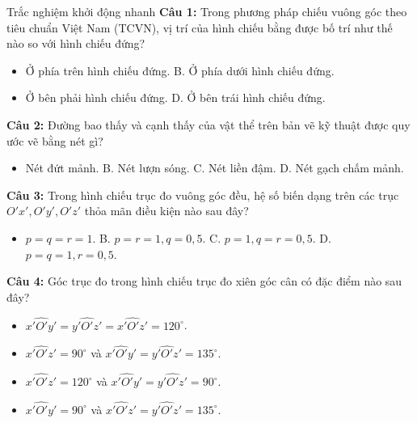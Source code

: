 \documentclass[12pt, a4paper]{article}
\begin{document}
\begin{pedabox}{Trắc nghiệm khởi động nhanh}
\textbf{Câu 1:} Trong phương pháp chiếu vuông góc theo tiêu chuẩn Việt Nam (TCVN), vị trí của hình chiếu bằng được bố trí như thế nào so với hình chiếu đứng?
\begin{itemize}[leftmargin=0.5cm]
    \item[A.] Ở phía trên hình chiếu đứng. \quad B. Ở phía dưới hình chiếu đứng.
    \item[C.] Ở bên phải hình chiếu đứng. \quad D. Ở bên trái hình chiếu đứng.
\end{itemize}

\textbf{Câu 2:} Đường bao thấy và cạnh thấy của vật thể trên bản vẽ kỹ thuật được quy ước vẽ bằng nét gì?
\begin{itemize}[leftmargin=0.5cm]
    \item[A.] Nét đứt mảnh. \quad B. Nét lượn sóng. \quad C. Nét liền đậm. \quad D. Nét gạch chấm mảnh.
\end{itemize}

\textbf{Câu 3:} Trong hình chiếu trục đo vuông góc đều, hệ số biến dạng trên các trục $O'x', O'y', O'z'$ thỏa mãn điều kiện nào sau đây?
\begin{itemize}[leftmargin=0.5cm]
    \item[A.] $p = q = r = 1$. \quad B. $p = r = 1, q = 0{,}5$. \quad C. $p = 1, q = r = 0{,}5$. \quad D. $p = q = 1, r = 0{,}5$.
\end{itemize}

\textbf{Câu 4:} Góc trục đo trong hình chiếu trục đo xiên góc cân có đặc điểm nào sau đây?
\begin{itemize}[leftmargin=0.5cm]
    \item[A.] $\widehat{x'O'y'} = \widehat{y'O'z'} = \widehat{x'O'z'} = 120^\circ$.
    \item[B.] $\widehat{x'O'z'} = 90^\circ$ và $\widehat{x'O'y'} = \widehat{y'O'z'} = 135^\circ$.
    \item[C.] $\widehat{x'O'z'} = 120^\circ$ và $\widehat{x'O'y'} = \widehat{y'O'z'} = 90^\circ$.
    \item[D.] $\widehat{x'O'y'} = 90^\circ$ và $\widehat{x'O'z'} = \widehat{y'O'z'} = 135^\circ$.
\end{itemize}
\end{pedabox}
\end{document}
